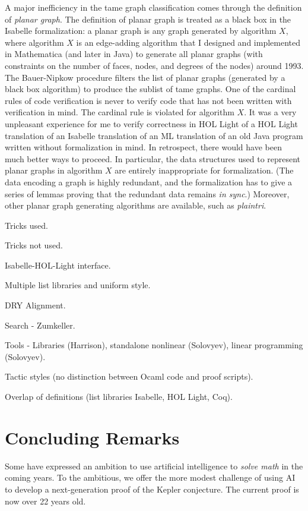 \documentclass{amsart}
\begin{document}
A major inefficiency in the tame graph classification comes through
the definition of \emph{planar graph}.  The definition of planar graph
is treated as a black box in the Isabelle formalization: a planar
graph is any graph generated by algorithm $X$, where algorithm $X$ is
an edge-adding algorithm that I designed and implemented in
Mathematica (and later in Java) to generate all planar graphs (with
constraints on the number of faces, nodes, and degrees of the nodes)
around 1993.  The Bauer-Nipkow procedure filters the list of planar
graphs (generated by a black box algorithm) to produce the sublist of
tame graphs.  One of the cardinal rules of code verification is never
to verify code that has not been written with verification in mind.
The cardinal rule is violated for algorithm $X$.  It was a very
unpleasant experience for me to verify correctness in HOL Light of a
HOL Light translation of an Isabelle translation of an ML translation
of an old Java program written without formalization in mind.  In
retrospect, there would have been much better ways to proceed.  In
particular, the data structures used to represent planar graphs in
algorithm $X$ are entirely inappropriate for formalization.  (The data
encoding a graph is highly redundant, and the formalization has to
give a series of lemmas proving that the redundant data remains
\emph{in sync}.)  Moreover, other planar graph generating algorithms
are available, such as \emph{plaintri}.

















Tricks used.

Tricks not used.



Isabelle-HOL-Light interface.

Multiple list libraries and uniform style.

DRY Alignment.

Search - Zumkeller.

Tools - Libraries (Harrison), standalone nonlinear (Solovyev), linear programming (Solovyev).

Tactic styles (no distinction between Ocaml code and proof scripts).

Overlap of definitions (list libraries Isabelle, HOL Light, Coq).



\section{Concluding Remarks}

Some have expressed an ambition to use artificial intelligence to
\emph{solve math} in 
the coming years.  To the ambitious, we offer the more modest
challenge of using AI to develop a next-generation proof of the Kepler
conjecture.  The current proof is now over 22 years old.


\newpage


 

\end{document}
